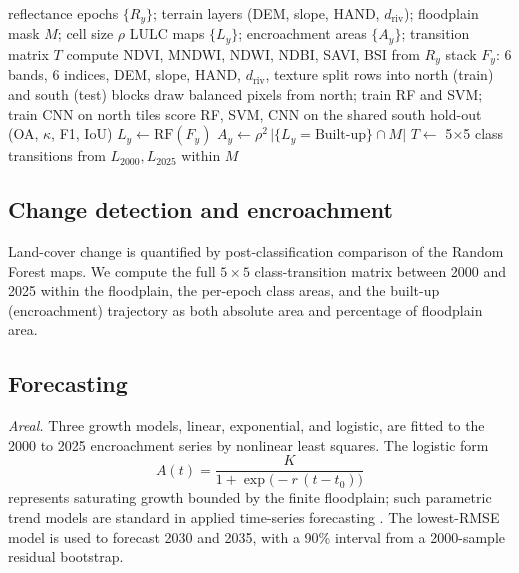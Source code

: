 \documentclass[journal]{IEEEtran}
\begin{document}
\begin{algorithm}[!t]
\caption{Land-cover classification and encroachment mapping}
\label{alg:classify}
\begin{algorithmic}[1]
\Require reflectance epochs $\{R_y\}$; terrain layers (DEM, slope, HAND, $d_{\mathrm{riv}}$); floodplain mask $M$; cell size $\rho$
\Ensure LULC maps $\{L_y\}$; encroachment areas $\{A_y\}$; transition matrix $T$
  \State compute NDVI, MNDWI, NDWI, NDBI, SAVI, BSI from $R_y$
  \State stack $F_y$: 6 bands, 6 indices, DEM, slope, HAND, $d_{\mathrm{riv}}$, texture 
\EndFor
\State split rows into north (train) and south (test) blocks
\State draw balanced pixels from north; train RF and SVM; train CNN on north tiles
\State score RF, SVM, CNN on the shared south hold-out (OA, $\kappa$, F1, IoU)
  \State $L_y \gets \mathrm{RF}(F_y)$ 
  \State $A_y \gets \rho^2 \, \lvert \{L_y=\text{Built-up}\} \cap M \rvert$
\EndFor
\State $T \gets$ 5$\times$5 class transitions from $L_{2000},L_{2025}$ within $M$
\end{algorithmic}
\end{algorithm}
\subsection{Change detection and encroachment}

Land-cover change is quantified by post-classification comparison \cite{singh1989digital,lu2004change} of the Random Forest maps. We compute the full $5\times5$ class-transition matrix between 2000 and 2025 within the floodplain, the per-epoch class areas, and the built-up (encroachment) trajectory as both absolute area and percentage of floodplain area.

\subsection{Forecasting}
\emph{Areal.} Three growth models, linear, exponential, and logistic, are fitted to the 2000 to 2025 encroachment series by nonlinear least squares. The logistic form
\begin{equation}
A(t)=\frac{K}{1+\exp\!\big(-r\,(t-t_0)\big)}
\label{eq:logistic}
\end{equation}
represents saturating growth bounded by the finite floodplain; such parametric trend models are standard in applied time-series forecasting \cite{box2015time,hyndman2018forecasting}. The lowest-RMSE model is used to forecast 2030 and 2035, with a 90\% interval from a 2000-sample residual bootstrap.
\end{document}

